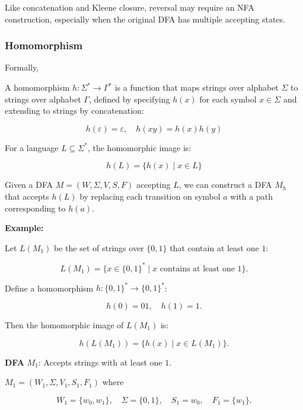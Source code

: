 \documentclass[12pt,a4paper,openany]{article}
\begin{document}
Like concatenation and Kleene closure, reversal may require an NFA construction, especially when the original DFA has multiple accepting states.

\subsubsection{Homomorphism}

Formally,

A homomorphism $h: \Sigma^* \to \Gamma^*$ is a function that maps strings over alphabet $\Sigma$ to strings over alphabet $\Gamma$, defined by specifying $h(x)$ for each symbol $x \in \Sigma$ and extending to strings by concatenation:

\[h(\varepsilon) = \varepsilon, \quad h(xy) = h(x)h(y)\]

For a language $L \subseteq \Sigma^*$, the homomorphic image is:

\[h(L) = \{ h(x) \mid x \in L \}\]

Given a DFA $M = (W, \Sigma, V, S, F)$ accepting $L$, we can construct a DFA $M_h$ that accepts $h(L)$ by replacing each transition on symbol $a$ with a path corresponding to $h(a)$.

\textbf{Example:}

Let $L(M_1)$ be the set of strings over $\{0,1\}$ that contain at least one $1$:

\[ L(M_1) = \{ x \in \{0,1\}^* \mid x \text{ contains at least one } 1 \}. \]

Define a homomorphism $h: \{0,1\}^* \to \{0,1\}^*$:

\[ h(0) = 01, \quad h(1) = 1. \]

Then the homomorphic image of $L(M_1)$ is:

\[ h(L(M_1)) = \{ h(x) \mid x \in L(M_1) \}. \]

\textbf{DFA} $M_1$: Accepts strings with at least one $1$.

$M_1 = (W_1, \Sigma, V_1, S_1, F_1)$ where

\[ W_1 = \{w_0,w_1\}, \quad \Sigma = \{0,1\}, \quad S_1 = w_0, \quad F_1 = \{w_1\}. \]

\begin{center}
\end{center}
\end{document}
